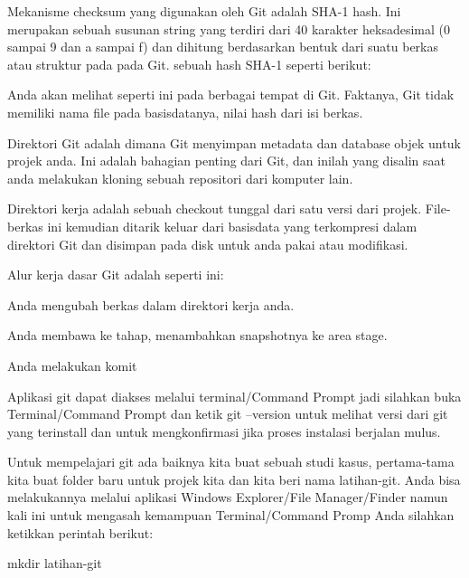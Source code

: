 \noindent 
 \hspace*{0.5in} Mekanisme checksum yang digunakan oleh Git adalah SHA-1 hash. Ini merupakan sebuah susunan string yang terdiri dari 40 karakter heksadesimal (0 sampai 9 dan a sampai f) dan dihitung berdasarkan bentuk dari suatu berkas atau struktur pada pada Git. sebuah hash SHA-1 seperti berikut: \par
\noindent 
Anda akan melihat seperti ini pada berbagai tempat di Git. Faktanya, Git tidak memiliki nama file pada basisdatanya, nilai hash dari isi berkas. \par
\noindent 
Direktori Git adalah dimana Git menyimpan metadata dan database objek untuk projek anda. Ini adalah bahagian penting dari Git, dan inilah yang disalin saat anda melakukan kloning sebuah repositori dari komputer lain. \par
\noindent 
Direktori kerja adalah sebuah checkout tunggal dari satu versi dari projek. File-berkas ini kemudian ditarik keluar dari basisdata yang terkompresi dalam direktori Git dan disimpan pada disk untuk anda pakai atau modifikasi. \par
\noindent 
 \hspace*{0.5in} Alur kerja dasar Git adalah seperti ini: \par
\noindent 
 \hspace*{0.5in} Anda mengubah berkas dalam direktori kerja anda. \par
\noindent 
 \hspace*{0.5in} Anda membawa ke tahap, menambahkan snapshotnya ke area stage. \par
\noindent 
 \hspace*{0.5in} Anda melakukan komit \par
\noindent 
 \hspace*{0.5in} Aplikasi git dapat diakses melalui terminal/Command Prompt jadi silahkan buka Terminal/Command Prompt dan ketik $  $git --version $  $untuk melihat versi dari git yang terinstall dan untuk mengkonfirmasi jika proses instalasi berjalan mulus.  \par
\noindent 
Untuk mempelajari git ada baiknya kita buat sebuah studi kasus, pertama-tama kita buat folder baru untuk projek kita dan kita beri nama latihan-git. Anda bisa melakukannya melalui aplikasi Windows Explorer/File Manager/Finder namun kali ini untuk mengasah kemampuan Terminal/Command Promp Anda silahkan ketikkan perintah berikut: \par
\noindent 
 \hspace*{0.5in} mkdir latihan-git \par
